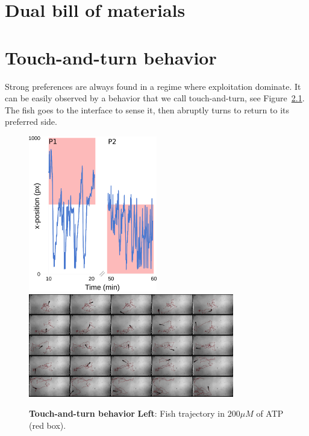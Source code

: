 \begin{appendices}

  \chapter{Dual bill of materials}
  
  \label{bom}

  \chapter{Touch-and-turn behavior}
    \label{touch-and-turn}
    Strong preferences are always found in a regime where exploitation dominate. It can be easily observed by a behavior that we call touch-and-turn, see Figure~\ref{touchandturn}. The fish goes to the interface to sense it, then abruptly turns to return to its preferred side.

      \begin{figure}[h]
        \centering
        \includegraphics[width=0.5\textwidth]{part_2/assets/trace.png}
        \includegraphics[width=0.8\textwidth]{part_2/assets/ret.png}
        \caption{\textbf{Touch-and-turn behavior} \textbf{Left}: Fish trajectory in $200 \mu M$ of ATP (red box).}
        \label{touchandturn}
      \end{figure}



\end{appendices}
